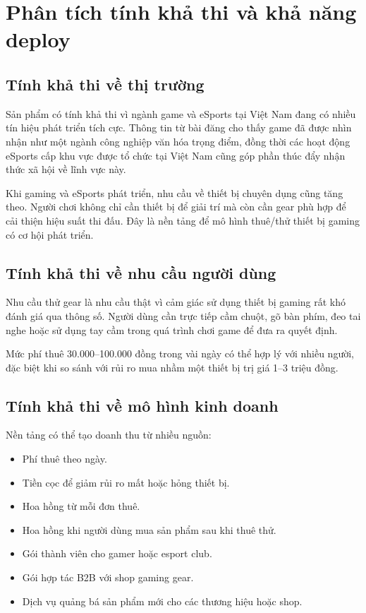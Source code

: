 \section{Phân tích tính khả thi và khả năng deploy}

\subsection{Tính khả thi về thị trường}

Sản phẩm có tính khả thi vì ngành game và eSports tại Việt Nam đang có nhiều tín hiệu phát triển tích cực. Thông tin từ bài đăng cho thấy game đã được nhìn nhận như một ngành công nghiệp văn hóa trọng điểm, đồng thời các hoạt động eSports cấp khu vực được tổ chức tại Việt Nam cũng góp phần thúc đẩy nhận thức xã hội về lĩnh vực này.

Khi gaming và eSports phát triển, nhu cầu về thiết bị chuyên dụng cũng tăng theo. Người chơi không chỉ cần thiết bị để giải trí mà còn cần gear phù hợp để cải thiện hiệu suất thi đấu. Đây là nền tảng để mô hình thuê/thử thiết bị gaming có cơ hội phát triển.

\subsection{Tính khả thi về nhu cầu người dùng}

Nhu cầu thử gear là nhu cầu thật vì cảm giác sử dụng thiết bị gaming rất khó đánh giá qua thông số. Người dùng cần trực tiếp cầm chuột, gõ bàn phím, đeo tai nghe hoặc sử dụng tay cầm trong quá trình chơi game để đưa ra quyết định.

Mức phí thuê 30.000--100.000 đồng trong vài ngày có thể hợp lý với nhiều người, đặc biệt khi so sánh với rủi ro mua nhầm một thiết bị trị giá 1--3 triệu đồng.

\subsection{Tính khả thi về mô hình kinh doanh}

Nền tảng có thể tạo doanh thu từ nhiều nguồn:

\begin{itemize}
    \item Phí thuê theo ngày.
    \item Tiền cọc để giảm rủi ro mất hoặc hỏng thiết bị.
    \item Hoa hồng từ mỗi đơn thuê.
    \item Hoa hồng khi người dùng mua sản phẩm sau khi thuê thử.
    \item Gói thành viên cho gamer hoặc esport club.
    \item Gói hợp tác B2B với shop gaming gear.
    \item Dịch vụ quảng bá sản phẩm mới cho các thương hiệu hoặc shop.
\end{itemize}


